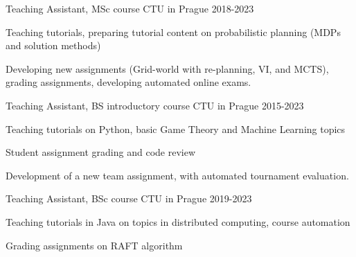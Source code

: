\begin{cventries}


  \cventry
    {Teaching Assistant, MSc course} %
    {} %
    {CTU in Prague} %
    {2018-2023} %
    {
      \begin{cvitems} %
        \item {Teaching tutorials, preparing tutorial content on probabilistic planning (MDPs and solution methods)}
        \item {Developing new assignments (Grid-world with re-planning, VI, and MCTS), grading assignments, developing automated online exams.}
      \end{cvitems}
    }

  \cventry
    {Teaching Assistant, BS introductory course} %
    {} %
    {CTU in Prague} %
    {2015-2023} %
    {
      \begin{cvitems} %
        \item {Teaching tutorials on Python, basic Game Theory and Machine Learning topics}
        \item {Student assignment grading and code review}
        \item {Development of a new team assignment,  with automated tournament evaluation.}
      \end{cvitems}
    }

  \cventry
    {Teaching Assistant, BSc course} %
    {} %
    {CTU in Prague} %
    {2019-2023} %
    {
      \begin{cvitems} %
        \item {Teaching tutorials in Java on topics in distributed computing, course automation}
        \item {Grading assignments on RAFT algorithm}
      \end{cvitems}
    }

\end{cventries}
    


